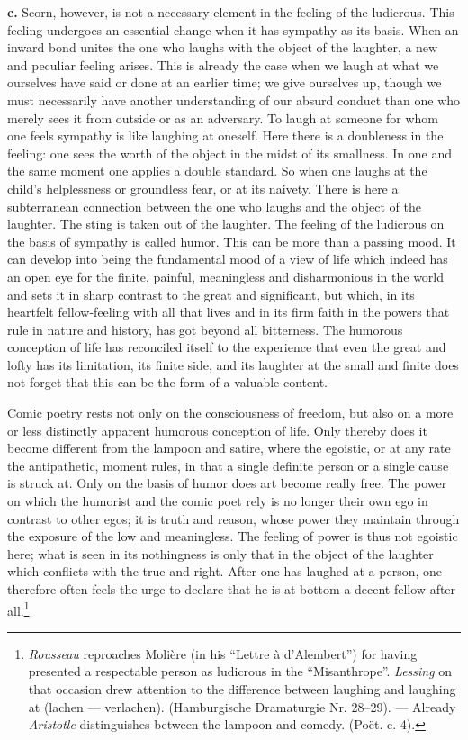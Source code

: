 \documentclass[12pt,a4paper]{book}
\newcommand{\opage}[1]{\marginnote{\footnotesize\textit{[#1]}}}
\begin{document}
\textbf{c.} Scorn, however, is not a necessary element in the feeling of
the ludicrous. This feeling undergoes an essential change when it has
sympathy as its basis. When an inward bond unites the one who laughs
with the object of the laughter, a new and peculiar feeling arises. This
is already the case when we laugh at what we ourselves have said or done
at an earlier time; we give ourselves up, though we must necessarily
have another understanding of our absurd conduct than one who merely
sees it from outside or as an adversary. To laugh at someone for whom
one feels sympathy is like laughing at oneself. Here there is a
doubleness in the feeling: one sees the worth of the object in the midst
of its smallness. In one and the same moment one applies a double
standard. So when one laughs at the child's helplessness or groundless
fear, or at its naivety. There is here a subterranean connection between
the one who laughs and the object of the laughter. The sting is taken
out of the laughter. The feeling of the ludicrous on the basis of
sympathy is called humor. This can be more than a passing mood. It can
develop into being the fundamental mood of a view of life which indeed
has an open eye for the finite, painful, meaningless and disharmonious
in the world and sets it in sharp contrast to the great and significant,
but which, in its heartfelt fellow-feeling with all that lives and in
its firm faith in the powers that rule in nature and history, has got
beyond all bitterness. The humorous conception of life has reconciled
itself to the experience that even the great and lofty has its
limitation, its finite side, and its laughter at the small and finite
does not forget that this can be the form of a valuable content.

Comic poetry rests not only on the consciousness of freedom, but also on
a more or less distinctly apparent humorous conception of life. Only
thereby does it become different from the lampoon and satire, where the
egoistic, or at any rate the antipathetic, moment rules, in that
\opage{349}a single definite person or a single cause is struck at. Only
on the basis of humor does art become really free. The power on which
the humorist and the comic poet rely is no longer their own ego in
contrast to other egos; it is truth and reason, whose power they
maintain through the exposure of the low and meaningless. The feeling of
power is thus not egoistic here; what is seen in its nothingness is only
that in the object of the laughter which conflicts with the true and
right. After one has laughed at a person, one therefore often feels the
urge to declare that he is
at bottom a decent fellow after all.\footnote{\emph{Rousseau} reproaches
Molière (in his ``Lettre à d’Alembert'') for having presented a
respectable person as ludicrous in the ``Misanthrope''. \emph{Lessing}
on that occasion drew attention to the difference between laughing and
laughing at (lachen --- verlachen). (Hamburgische Dramaturgie Nr.
28--29). --- Already \emph{Aristotle} distinguishes between the lampoon
and comedy. (Poët. c. 4).}
\end{document}
